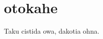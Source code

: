 \begingroup
\let\clearpage\relax
\let\cleardoublepage\relax
\let\cleardoublepage\relax

\chapter*{otokahe}

Taku cistida owa, dakotia ohna.



\endgroup			

\vfill